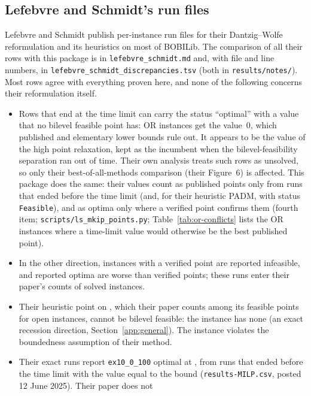 \subsection{Lefebvre and Schmidt's run files}\label{app:ls}

Lefebvre and Schmidt publish per-instance run files for their Dantzig--Wolfe
reformulation and its heuristics on most of BOBILib.\cite{lefebvre2025dantzig}
The comparison of all their rows with this package is in
\texttt{lefebvre\_schmidt.md} and, with file and line numbers, in
\texttt{lefebvre\_schmidt\_discrepancies.tsv} (both in \texttt{results/notes/}).
Most rows agree with everything
proven here, and none of the following concerns their reformulation itself.
\begin{itemize}
\item Rows that end at the time limit can carry the status ``optimal'' with a
value that no bilevel feasible point has: \LsOrZeroOptimal{} OR instances get the
value~0, which published and elementary lower bounds rule out. It appears to be
the value of the high point relaxation, kept as the incumbent when the
bilevel-feasibility separation ran out of time. Their own analysis treats such
rows as unsolved, so only their best-of-all-methods comparison (their Figure~6)
is affected. This package does the same: their values count as published
points only from runs that ended before the time limit (and, for their
heuristic PADM, with status \texttt{Feasible}), and as optima only where a
verified point confirms them (fourth item;
\texttt{scripts/ls\_mkip\_points.py}; Table~\ref{tab:or-conflicts} lists the
OR instances where a time-limit value would otherwise be the best published
point).
\item In the other direction, \LsInfeasibleVerifiedPoint{} instances with a
verified point are reported infeasible, and \LsWrongOptima{} reported optima are
worse than verified points; these runs enter their paper's counts of solved
instances.
\item Their heuristic point on \texttt{\LsBadPadmName}, which their paper counts
among its feasible points for open instances, cannot be bilevel feasible: the
instance has none (an exact recession direction, Section~\ref{app:general}). The
instance violates the boundedness assumption of their method.
\item Their exact runs report \texttt{ex10\_0\_100} optimal at
\ExTenOptimum{}, from runs that ended before the time limit with the value equal
to the bound (\texttt{results-MILP.csv}, posted 12 June 2025). Their paper does not

\end{itemize}
